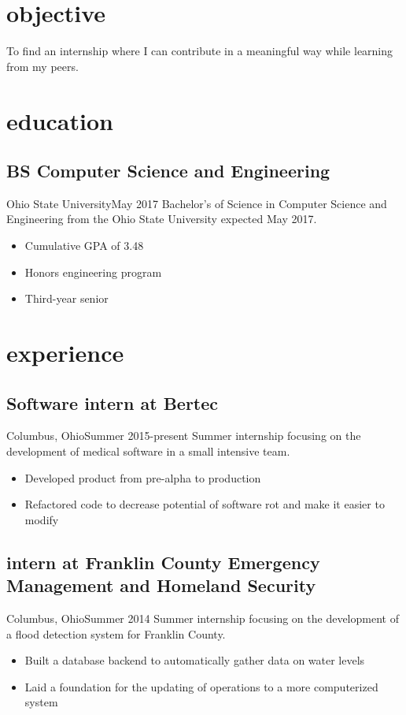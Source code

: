 \documentclass[letterpaper]{cv}
\begin{document}
	\author{Brandon A. Moore}
	\maketitle
	
	\section{objective}
		To find an internship where I can contribute in a meaningful way while learning from my peers.
		
	\section{education}
		\subsection{BS Computer Science and Engineering}{Ohio State University}{May 2017}
			Bachelor's of Science in Computer Science and Engineering from the Ohio State University expected May 2017.
			\begin{itemize}
				\item Cumulative GPA of 3.48
				\item Honors engineering program
				\item Third-year senior
			\end{itemize}

	\section{experience}
		\subsection{Software intern at Bertec}{Columbus, Ohio}{Summer 2015-present}
			Summer internship focusing on the development of medical software in a small intensive team.
			\begin{itemize}
				\item Developed product from pre-alpha to production
				\item Refactored code to decrease potential of software rot and make it easier to modify
			\end{itemize}
	
		\subsection{intern at Franklin County Emergency\\ Management and Homeland Security}{Columbus, Ohio}{Summer 2014}
			Summer internship focusing on the development of a flood detection system for Franklin County.
			\begin{itemize}
				\item Built a database backend to automatically gather data on water levels
				\item Laid a foundation for the updating of operations to a more computerized system
			\end{itemize}
\end{document}
